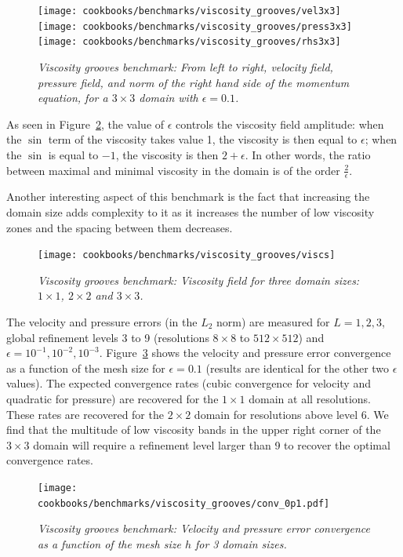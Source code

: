 \documentclass{article}
\begin{document}
\begin{figure}
\centering
\texttt{[image: cookbooks/benchmarks/viscosity\_grooves/vel3x3]}
\texttt{[image: cookbooks/benchmarks/viscosity\_grooves/press3x3]}
\texttt{[image: cookbooks/benchmarks/viscosity\_grooves/rhs3x3]}
\hfill
\caption{\it Viscosity grooves benchmark: From left to right, velocity field, pressure field, and 
norm of the right hand side of the momentum equation, for a $3\times 3$ domain 
with $\epsilon=0.1$.}
\label{fig:benchmark-grooves-3x3}
\end{figure}

As seen in Figure~\ref{fig:benchmark-grooves-domains}, the value of $\epsilon$ controls the viscosity field amplitude:
when the $\sin$ term of the viscosity takes value 1, the viscosity is then equal to $\epsilon$; when the $\sin$ is 
equal to $-1$, the viscosity is then $2+\epsilon$. In other words, the ratio between maximal and minimal 
viscosity in the domain is of the order $\frac{2}{\epsilon}$.

Another interesting aspect of this benchmark is the fact that increasing the domain size
adds complexity to it as it increases the number of low viscosity zones and the spacing 
between them decreases.

\begin{figure}
\centering
\texttt{[image: cookbooks/benchmarks/viscosity\_grooves/viscs]}
\caption{\it Viscosity grooves benchmark: Viscosity field for three domain sizes: $1\times 1$, $2\times 2$ and $3\times 3$.} 
\label{fig:benchmark-grooves-domains}
\end{figure}

The velocity and pressure errors (in the $L_2$ norm) are measured for $L=1,2,3$, global refinement 
levels 3 to 9 (resolutions $8\times 8$ to $512\times 512$)  
and $\epsilon=10^{-1},10^{-2},10^{-3}$. Figure~\ref{fig:benchmark-grooves-errors} shows the velocity and pressure error convergence as a function of the mesh size for $\epsilon=0.1$ (results are identical for the other two $\epsilon$ values).
The expected convergence rates (cubic convergence for velocity and quadratic for pressure) are recovered for the $1\times 1$ domain at all resolutions. These rates are recovered for the $2\times 2$ domain for resolutions above level 6. We find that 
the multitude of low viscosity bands in the upper right corner of the $3\times 3$ domain will require a refinement level larger than 9 to recover the optimal convergence rates. 

\begin{figure}
\centering
\texttt{[image: cookbooks/benchmarks/viscosity\_grooves/conv\_0p1.pdf]} 
\caption{\it Viscosity grooves benchmark: Velocity and pressure error convergence as a function of the mesh size $h$ for 3 domain sizes.} 
\label{fig:benchmark-grooves-errors}
\end{figure}
\end{document}
